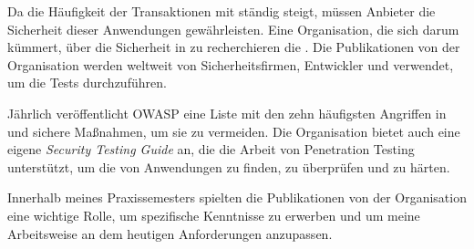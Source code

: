 Da die Häufigkeit der Transaktionen mit  ständig steigt, müssen Anbieter die Sicherheit dieser Anwendungen gewährleisten. Eine Organisation, die sich darum kümmert, über die Sicherheit in  zu recherchieren die . Die Publikationen von der Organisation werden weltweit von Sicherheitsfirmen, Entwickler und  verwendet, um die Tests durchzuführen. 

Jährlich veröffentlicht \gls{OWASP} eine Liste mit den zehn häufigsten Angriffen in  und sichere Maßnahmen, um sie zu vermeiden. Die Organisation bietet auch eine eigene \textit{Security Testing Guide} an, die die Arbeit von Penetration Testing unterstützt, um die  von Anwendungen zu finden, zu überprüfen und zu härten.

Innerhalb meines Praxissemesters spielten die Publikationen von der Organisation eine wichtige Rolle, um spezifische Kenntnisse zu erwerben und um meine Arbeitsweise an dem heutigen Anforderungen anzupassen. 

